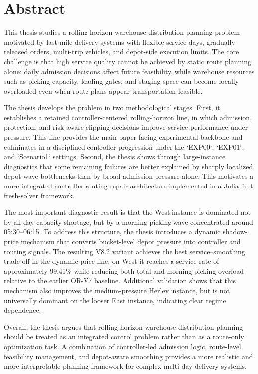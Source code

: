 \section*{Abstract}

This thesis studies a rolling-horizon warehouse-distribution planning problem motivated by last-mile delivery systems with flexible service days, gradually released orders, multi-trip vehicles, and depot-side execution limits. The core challenge is that high service quality cannot be achieved by static route planning alone: daily admission decisions affect future feasibility, while warehouse resources such as picking capacity, loading gates, and staging space can become locally overloaded even when route plans appear transportation-feasible.

The thesis develops the problem in two methodological stages. First, it establishes a retained controller-centered rolling-horizon line, in which admission, protection, and risk-aware clipping decisions improve service performance under pressure. This line provides the main paper-facing experimental backbone and culminates in a disciplined controller progression under the `EXP00`, `EXP01`, and `Scenario1` settings. Second, the thesis shows through large-instance diagnostics that some remaining failures are better explained by sharply localized depot-wave bottlenecks than by broad admission pressure alone. This motivates a more integrated controller-routing-repair architecture implemented in a Julia-first fresh-solver framework.

The most important diagnostic result is that the West instance is dominated not by all-day capacity shortage, but by a morning picking wave concentrated around 05:30--06:15. To address this structure, the thesis introduces a dynamic shadow-price mechanism that converts bucket-level depot pressure into controller and routing signals. The resulting V8.2 variant achieves the best service--smoothing trade-off in the dynamic-price line: on West it reaches a service rate of approximately 99.41\% while reducing both total and morning picking overload relative to the earlier OR-V7 baseline. Additional validation shows that this mechanism also improves the medium-pressure Herlev instance, but is not universally dominant on the looser East instance, indicating clear regime dependence.

Overall, the thesis argues that rolling-horizon warehouse-distribution planning should be treated as an integrated control problem rather than as a route-only optimization task. A combination of controller-led admission logic, route-level feasibility management, and depot-aware smoothing provides a more realistic and more interpretable planning framework for complex multi-day delivery systems.
